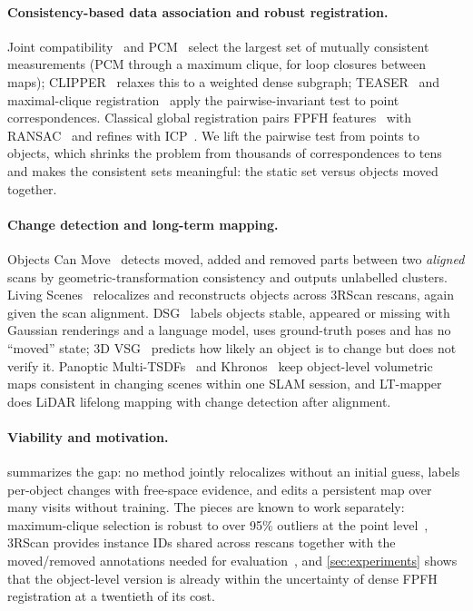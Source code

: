 \documentclass[11pt, a4paper]{article}
\begin{document}
\paragraph{Consistency-based data association and robust registration.} Joint compatibility~\cite{neira2001jcbb} and
PCM~\cite{mangelson2018pcm} select the largest set of mutually consistent measurements (PCM through a maximum clique, for
loop closures between maps); CLIPPER~\cite{lusk2021clipper} relaxes this to a weighted dense subgraph;
TEASER~\cite{yang2021teaser} and maximal-clique registration~\cite{zhang2023maxclique} apply the pairwise-invariant test to
point correspondences. Classical global registration pairs FPFH features~\cite{rusu2009fpfh} with
RANSAC~\cite{fischler1981ransac} and refines with ICP~\cite{besl1992icp,chen1992pointplane}. We lift the pairwise test
from points to objects, which shrinks the problem from thousands of correspondences to tens and makes the consistent sets
meaningful: the static set versus objects moved together.

\paragraph{Change detection and long-term mapping.} Objects Can Move~\cite{adam2022objects} detects moved, added and
removed parts between two \emph{aligned} scans by geometric-transformation consistency and outputs unlabelled clusters.
Living Scenes~\cite{zhu2024livingscenes} relocalizes and reconstructs objects across 3RScan rescans, again given the scan
alignment. DSG~\cite{dsg2026dynamic} labels objects stable, appeared or missing with Gaussian renderings and a language
model, uses ground-truth poses and has no ``moved'' state; 3D VSG~\cite{looper2023vsg} predicts how likely an object is to
change but does not verify it. Panoptic Multi-TSDFs~\cite{schmid2022panoptic} and Khronos~\cite{schmid2024khronos} keep
object-level volumetric maps consistent in changing scenes within one SLAM session, and LT-mapper~\cite{kim2022ltmapper}
does LiDAR lifelong mapping with change detection after alignment.

\paragraph{Viability and motivation.}  summarizes the gap: no method jointly relocalizes without
an initial guess, labels per-object changes with free-space evidence, and edits a persistent map over many visits
without training. The pieces are known to work separately: maximum-clique selection is robust to over 95\% outliers at the
point level~\cite{yang2021teaser,zhang2023maxclique}, 3RScan provides instance IDs shared across rescans together with
the moved/removed annotations needed for evaluation~\cite{wald2019rio}, and \cref{sec:experiments} shows that the
object-level version is already within the uncertainty of dense FPFH registration at a twentieth of its cost.
\end{document}
